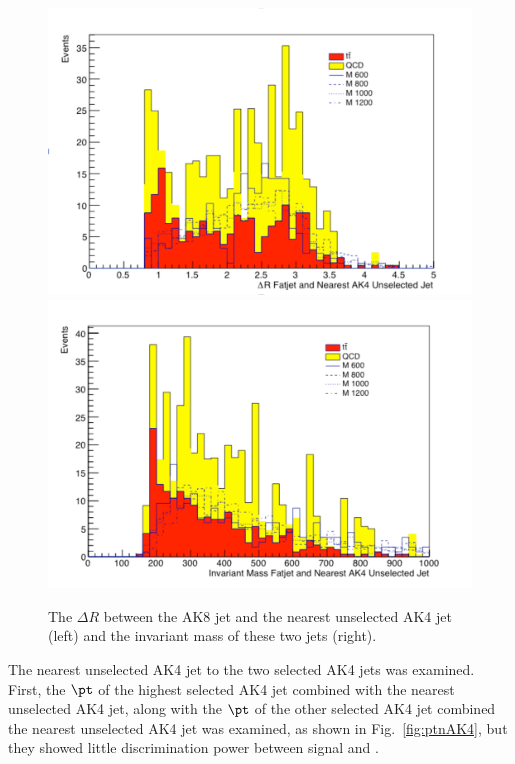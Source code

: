 \begin{figure}[thb!]
\begin{center}
\includegraphics[scale=0.34]{Figures/dRFJAK4.pdf}
\includegraphics[scale=0.34]{Figures/invMFJAK4.pdf}
\end{center}
\caption{The $\Delta R$ between the AK8 jet and the nearest unselected AK4 jet (left) and the invariant mass of these two jets (right).}
\label{fig:AK4FJ}
\end{figure} 

The nearest unselected AK4 jet to the two selected AK4 jets was examined. First, the $\pt$ of the highest selected AK4 jet combined with the nearest unselected AK4 jet, along with the $\pt$ of the other selected AK4 jet combined the nearest unselected AK4 jet was examined, as shown in Fig.~\ref{fig:ptnAK4}, but they showed little discrimination power between signal and \ttbar.

